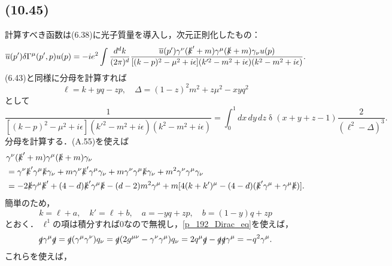 \subsection{(10.45)}
計算すべき函数は(6.38)に光子質量を導入し，次元正則化したもの：
\[
\overline{u}(p') \delta\Gamma^\mu(p', p) u(p) = - ie^2 \int \frac{d^dk}{(2\pi)^d}
\frac{\overline{u}(p') \gamma^\nu (\slashed{k}' + m) \gamma^\mu (\slashed{k} + m) \gamma_\nu u(p)}
{[(k-p)^2 - \mu^2 + i\epsilon](k'^2 - m^2 + i\epsilon)(k^2 - m^2 + i\epsilon)} .
\]
(6.43)と同様に分母を計算すれば
\[ \ell = k + yq -zp , \quad \Delta = (1-z)^2 m^2 + z \mu^2 -xyq^2 \]
として
\[ \frac{1}{[(k-p)^2 - \mu^2 + i\epsilon](k'^2 - m^2 + i\epsilon)(k^2 - m^2 + i\epsilon)} = \int_0^1 dx\,dy\,dz \mathop\delta(x+y+z-1) \frac{2}{(\ell^2 - \Delta)^3} . \]
分母を計算する．(A.55)を使えば
\begin{align}
  \begin{split}
    & \gamma^\nu (\slashed{k}' + m) \gamma^\mu (\slashed{k} + m) \gamma_\nu \\
    &= \gamma^\nu \slashed{k}' \gamma^\mu \slashed{k} \gamma_\nu
    + m \gamma^\nu \slashed{k}' \gamma^\mu \gamma_\nu
    + m \gamma^\nu \gamma^\mu \slashed{k} \gamma_\nu
    + m^2 \gamma^\nu \gamma^\mu \gamma_\nu \\
    &= -2 \slashed{k} \gamma^\mu \slashed{k}' + (4-d) \slashed{k}' \gamma^\mu \slashed{k}
    - (d-2) m^2 \gamma^\mu + m [ 4(k+k')^\mu - (4-d) (\slashed{k}'\gamma^\mu + \gamma^\mu\slashed{k}) ] .
  \end{split}
  \label{10_45_eq_1}
\end{align}
簡単のため，
\[ k = \ell + a , \quad  k' = \ell + b , \quad a = -yq + zp , \quad b = (1-y)q + zp \]
とおく．
$\ell^1$の項は積分すれば$0$なので無視し，\eqref{p_192_Dirac_eq}を使えば，
\[
\slashed{q} \gamma^\mu \slashed{q} = \slashed{q} (\gamma^\mu\gamma^\nu) q_\nu
= \slashed{q} (2g^{\mu\nu} - \gamma^\nu\gamma^\mu) q_\nu = 2q^\mu \slashed{q} - \slashed{q} \slashed{q} \gamma^\mu = - q^2 \gamma^\mu .
\]
これらを使えば，
